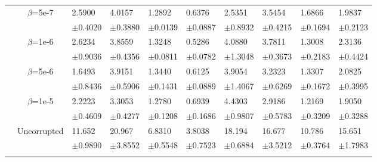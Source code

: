 \documentclass{article}
\begin{document}
\begin{table}[h!]
{\begin{tabularx}{\textwidth}{ccX X X X X X X X}
        & \multirow{2}{*}{$\beta$=5e-7}
        & 2.5900 & 4.0157 & 1.2892 & 0.6376 & 2.5351 & 3.5454 & 1.6866 & 1.9837\\
        &&\scriptsize$\pm$0.4020 & \scriptsize $\pm$0.3880 & \scriptsize $\pm$0.0139 & \scriptsize $\pm$0.0887 & \scriptsize $\pm$0.8932 & \scriptsize $\pm$0.4215 & \scriptsize $\pm$0.1694 & \scriptsize $\pm$0.2123\\

        \cline{3-10}\rule{0pt}{2.3ex}

        & \multirow{2}{*}{$\beta$=1e-6}
        & 2.6234 & 3.8559 & 1.3248 & 0.5286 & 4.0880 & 3.7811 & 1.3008 & 2.3136\\
        &&\scriptsize$\pm$0.9036 & \scriptsize $\pm$0.4356 & \scriptsize $\pm$0.0811 & \scriptsize $\pm$0.0782 & \scriptsize $\pm$1.3048 & \scriptsize $\pm$0.3673 & \scriptsize $\pm$0.2183 & \scriptsize $\pm$0.4424\\
 

        \cline{3-10}\rule{0pt}{2.3ex}

        & \multirow{2}{*}{$\beta$=5e-6}
        & 1.6493 & 3.9151 & 1.3440 & 0.6125 & 3.9054 & 3.2323 & 1.3307 & 2.0825\\
        &&\scriptsize$\pm$0.8436 & \scriptsize $\pm$0.5906 & \scriptsize $\pm$0.1431 & \scriptsize $\pm$0.0889 & \scriptsize $\pm$1.4067 & \scriptsize $\pm$0.6269 & \scriptsize $\pm$0.1672 & \scriptsize $\pm$0.3995\\
 

        \cline{3-10}\rule{0pt}{2.3ex}

        & \multirow{2}{*}{$\beta$=1e-5}
        & 2.2223 & 3.3053 & 1.2780 & 0.6939 & 4.4303 & 2.9186 & 1.2169 & 1.9050\\
        &&\scriptsize$\pm$0.4609 & \scriptsize $\pm$0.4277 & \scriptsize $\pm$0.1208 & \scriptsize $\pm$0.1686 & \scriptsize $\pm$0.9807 & \scriptsize $\pm$0.5783 & \scriptsize $\pm$0.3209 & \scriptsize $\pm$0.3288\\
        \hline\rule{0pt}{2.3ex}
        
    
        \multirow{12}{*}{ \textsf{MAE\textsubscript{nf}}}

        &\multirow{2}{*}{Uncorrupted}
        &11.652 & 20.967 & 6.8310 & 3.8038 & 18.194 & 16.677 & 10.786 & 15.651\\
        &&\scriptsize$\pm$0.9890 & \scriptsize $\pm$3.8552 & \scriptsize $\pm$0.5548 & \scriptsize $\pm$0.7523 & \scriptsize $\pm$0.6884 & \scriptsize $\pm$3.5212 & \scriptsize $\pm$0.3764 & \scriptsize $\pm$1.7983\\
        \cline{3-10}\rule{0pt}{2.3ex}


\end{tabularx}}
\end{table}
\end{document}
